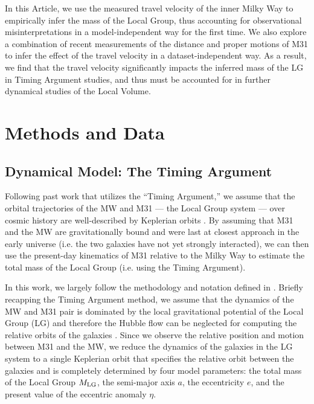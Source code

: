 \documentclass[twocolumn]{aastex631}
\newcommand{\mlg}{\ensuremath{M_{\rm LG}}}
\begin{document}
In this Article, we use the measured travel velocity of the inner Milky Way to
empirically infer the mass of the Local Group, thus accounting for observational
misinterpretations in a model-independent way for the first time.
We also explore a combination of recent measurements of the distance and proper
motions of M31 to infer the effect of the travel velocity in a
dataset-independent way.
As a result, we find that the travel velocity significantly impacts the inferred
mass of the LG in Timing Argument studies, and thus must be accounted for in
further dynamical studies of the Local Volume.
\section{Methods and Data}

\subsection{Dynamical Model: The Timing Argument}
\label{sec:timingarg}
Following past work that utilizes the ``Timing Argument,'' we assume that the
orbital trajectories of the MW and M31 --- the Local Group system --- over
cosmic history are well-described by Keplerian orbits \citep[e.g.,][]{Kahn1959,
Lynden-Bell:1981, Kroeker1991, LiWhite2008, vdm2012, Penarrubia2016}.
By assuming that M31 and the MW are gravitationally bound and were last at
closest approach in the early universe (i.e. the two galaxies have not yet
strongly interacted), we can then use the present-day kinematics of M31 relative
to the Milky Way to estimate the total mass of the Local Group (i.e. using the
Timing Argument).

In this work, we largely follow the methodology and notation defined in
\citet{Penarrubia2016}.
Briefly recapping the Timing Argument method, we assume that the dynamics of the
MW and M31 pair is dominated by the local gravitational potential of the Local
Group (LG) and therefore the Hubble flow can be neglected for computing the
relative orbits of the galaxies \citep[see, e.g.,][]{Penarrubia2014}.
Since we observe the relative position and motion between M31 and the MW, we
reduce the dynamics of the galaxies in the LG system to a single Keplerian orbit
that specifies the relative orbit between the galaxies and is completely
determined by four model parameters: the total mass of the Local Group \mlg, the
semi-major axis $a$, the eccentricity $e$, and the present value of the
eccentric anomaly $\eta$.
\end{document}
